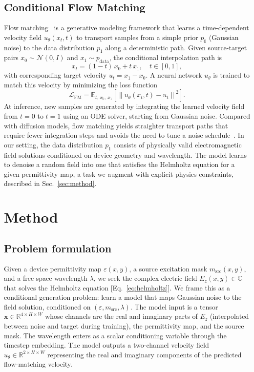 \documentclass[%
 reprint,
 amsmath,amssymb,
 aps,
floatfix,
]{revtex4-2}
\begin{document}
\subsection{Conditional Flow Matching}
Flow matching~\cite{Lipman2023FlowMatching, Liu2023RectifiedFlow} is a generative modeling framework that learns a time-dependent velocity field $u_\theta(x_t,t)$ to transport samples from a simple prior $p_0$ (Gaussian noise) to the data distribution $p_1$ along a deterministic path. Given source-target pairs $x_0\sim\mathcal{N}(0,I)$ and $x_1\sim p_\text{data}$, the conditional interpolation path is
\begin{equation}
    x_t = (1-t)\,x_0 + t\,x_1, \quad t\in[0,1],
    \label{eq:interpolation}
\end{equation}
with corresponding target velocity $u_t=x_1-x_0$. A neural network $u_{\theta}$ is trained to match this velocity by minimizing the loss function
\begin{equation}
    \mathcal{L}_\text{FM} = \mathbb{E}_{t,\,x_0,\,x_1}\!\left[\left\|u_\theta(x_t,t) - u_t\right\|^2\right].
    \label{eq:fm_loss}
\end{equation}
At inference, new samples are generated by integrating the learned velocity field from $t=0$ to $t=1$ using an ODE solver, starting from Gaussian noise. Compared with diffusion models, flow matching yields straighter transport paths that require fewer integration steps and avoids the need to tune a noise schedule~\cite{Lipman2023FlowMatching,Liu2023RectifiedFlow}.
In our setting, the data distribution $p_1$ consists of physically valid electromagnetic field solutions conditioned on device geometry and wavelength. The model learns to denoise a random field into one that satisfies the Helmholtz equation for a given permittivity map, a task we augment with explicit physics constraints, described in Sec.~\ref{sec:method}.
\section{\label{sec:method}Method}
\subsection{Problem formulation}
Given a device permittivity map $\varepsilon(x,y)$, a source excitation mask $m_\text{src}(x,y)$, and a free space wavelength $\lambda$, we seek the complex electric field $E_z(x,y)\in\mathbb{C}$ that solves the Helmholtz equation [Eq.~\eqref{eq:helmholtz}]. We frame this as a conditional generation problem: learn a model that maps Gaussian noise to the field solution, conditioned on $(\varepsilon, m_\text{src}, \lambda)$.
The model input is a tensor $\mathbf{x}\in\mathbb{R}^{4\times H\times W}$ whose channels are the real and imaginary parts of $E_z$ (interpolated between noise and target during training), the permittivity map, and the source mask. The wavelength enters as a scalar conditioning variable through the timestep embedding. The model outputs a two-channel velocity field $\hat{u}_\theta\in\mathbb{R}^{2\times H\times W}$ representing the real and imaginary components of the predicted flow-matching velocity.
\end{document}
